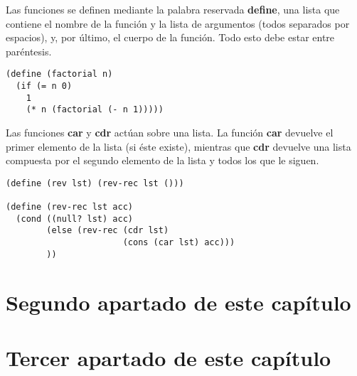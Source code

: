 Las funciones se definen mediante la palabra reservada \textbf{define}, una lista que contiene el nombre de la funci\'on y la lista de argumentos (todos separados por espacios), y, por \'ultimo, el cuerpo de la funci\'on. Todo esto debe estar entre par\'entesis.\\

\begin{minipage}{\linewidth}
\begin{small}
\begin{lstlisting}[frame=single]
(define (factorial n)
  (if (= n 0)
    1
    (* n (factorial (- n 1)))))
\end{lstlisting}
\end{small}
\end{minipage}

Las funciones \textbf{car} y \textbf{cdr} act\'uan sobre una lista. La funci\'on \textbf{car} devuelve el primer elemento de la lista (si \'este existe), mientras que \textbf{cdr} devuelve una lista compuesta por el segundo elemento de la lista y todos los que le siguen.\\

\begin{minipage}{\linewidth}
\begin{small}
\begin{lstlisting}[frame=single]
(define (rev lst) (rev-rec lst ()))

(define (rev-rec lst acc)
  (cond ((null? lst) acc)
        (else (rev-rec (cdr lst)
                       (cons (car lst) acc)))
        ))
\end{lstlisting}
\end{small}
\end{minipage}

\section{Segundo apartado de este cap\'itulo}
\label{3:sec2}

\section{Tercer apartado de este cap\'itulo}
\label{3:sec3}